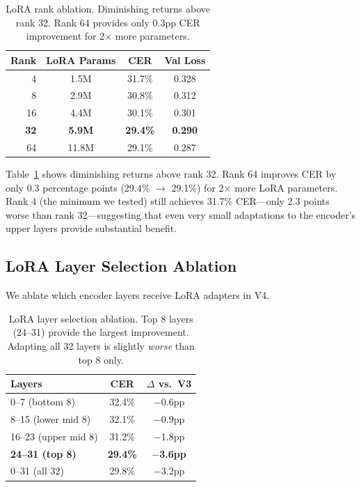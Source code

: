\documentclass[11pt]{article}
\begin{document}
\begin{table}[t]
\centering
\small
\begin{tabular}{rccc}
\toprule
\textbf{Rank} & \textbf{LoRA Params} & \textbf{CER} & \textbf{Val Loss} \\
\midrule
4 & 1.5M & 31.7\% & 0.328 \\
8 & 2.9M & 30.8\% & 0.312 \\
16 & 4.4M & 30.1\% & 0.301 \\
\textbf{32} & \textbf{5.9M} & \textbf{29.4\%} & \textbf{0.290} \\
64 & 11.8M & 29.1\% & 0.287 \\
\bottomrule
\end{tabular}
\caption{LoRA rank ablation. Diminishing returns above rank 32. Rank 64 provides only 0.3pp CER improvement for 2$\times$ more parameters.}
\label{tab:lora-rank-ablation}
\end{table}

Table~\ref{tab:lora-rank-ablation} shows diminishing returns above rank 32.
Rank 64 improves CER by only 0.3 percentage points (29.4\% $\to$ 29.1\%) for 2$\times$ more LoRA parameters.
Rank 4 (the minimum we tested) still achieves 31.7\% CER---only 2.3 points worse than rank 32---suggesting that even very small adaptations to the encoder's upper layers provide substantial benefit.

\subsection{LoRA Layer Selection Ablation}

We ablate which encoder layers receive LoRA adapters in V4.

\begin{table}[t]
\centering
\small
\begin{tabular}{lcc}
\toprule
\textbf{Layers} & \textbf{CER} & \textbf{$\Delta$ vs.\ V3} \\
\midrule
0--7 (bottom 8) & 32.4\% & $-$0.6pp \\
8--15 (lower mid 8) & 32.1\% & $-$0.9pp \\
16--23 (upper mid 8) & 31.2\% & $-$1.8pp \\
\textbf{24--31 (top 8)} & \textbf{29.4\%} & \textbf{$-$3.6pp} \\
0--31 (all 32) & 29.8\% & $-$3.2pp \\
\bottomrule
\end{tabular}
\caption{LoRA layer selection ablation. Top 8 layers (24--31) provide the largest improvement. Adapting all 32 layers is slightly \emph{worse} than top 8 only.}
\label{tab:lora-layer-ablation}
\end{table}
\end{document}
